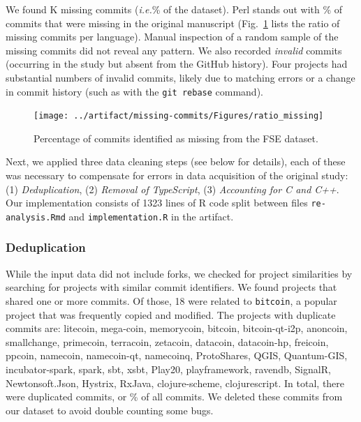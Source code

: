 \documentclass[acmsmall]{acmart}
\newcommand{\pct}[1]{#1\!\!\%\xspace}
\newcommand{\gh}{{GitHub}\xspace}
\newcommand{\code}[1]{{\tt\small #1}\xspace}
\newcommand{\ie}{\emph{i.e.}\xspace}
\begin{document}
We found \MissingCommitsThousands\!K missing commits
(\ie \pct{\MissingCommitsRatio} of the dataset). Perl stands out with
\pct{\PerlMissingRatio} of commits that were missing in the original
manuscript (Fig.~\ref{miss} lists the ratio of missing commits per
language). Manual inspection of a random sample of the missing commits did
not reveal any pattern.  
We also recorded {\it invalid} commits (occurring in the study but absent
from the \gh history). Four projects had substantial numbers of invalid
commits, likely due to matching errors or a change in commit history (such
as with the \code{git rebase} command).

\begin{figure}[!h]
\texttt{[image: ../artifact/missing-commits/Figures/ratio\_missing]}
\vspace{-8mm}
\caption{Percentage of commits identified as missing from the FSE dataset.}\label{miss}%
\end{figure}

Next, we applied three data cleaning steps (see below for details), each of
these was necessary to compensate for errors in data acquisition of the
original study: (1) \emph{Deduplication}, (2) \emph{Removal of TypeScript},
(3) \emph{Accounting for C and C++}.  Our implementation consists of 1323
lines of R code split between files \code{\small re-analysis.Rmd} and
\code{\small implem\-entation.R} in the artifact.


\subsubsection{Deduplication}
While the input data did not include forks, we checked for project
similarities by searching for projects with similar commit identifiers.  We
found \numberOfProjectsWithDuplicates projects that shared one or more
commits. Of those, 18 were related to \code{bitcoin}, a popular project that
was frequently copied and modified. The projects with duplicate commits are:
%
{\newcommand{\xxx}[1]{{\sf\small #1}}
\xxx{litecoin},
\xxx{mega}-\xxx{coin},
\xxx{memorycoin},
\xxx{bitcoin},
\xxx{bitcoin-qt-i2p},
\xxx{anoncoin},
\xxx{smallchange},
\xxx{primecoin},
\xxx{terracoin},
\xxx{zetacoin},
\xxx{datacoin},
\xxx{datacoin-hp},
\xxx{freicoin},
\xxx{ppcoin},
\xxx{namecoin},
\xxx{namecoin-qt},
\xxx{namecoinq},
\xxx{ProtoShares},
\xxx{QGIS},
\xxx{Quantum-GIS},
\xxx{incub\-ator-spark},
\xxx{spark},          
\xxx{sbt},
\xxx{xsbt},
\xxx{Play20},
\xxx{playframework},
\xxx{ravendb},
\xxx{SignalR},
\xxx{Newtonsoft.Json},
\xxx{Hystrix},
\xxx{RxJava},
\xxx{clojure-scheme},
\xxx{clojurescript}}.
%
In total, there were \numDuplicateCommits duplicated commits, or
\pct{\percentageDuplicateCommits} of all commits. We deleted these commits
from our dataset to avoid double counting some bugs.
\end{document}
